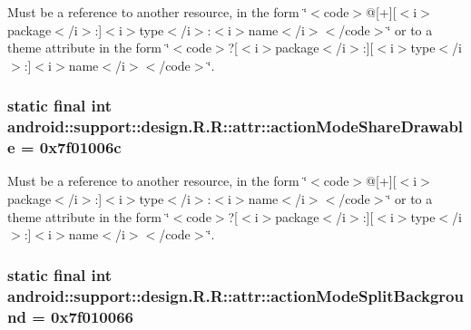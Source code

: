 Must be a reference to another resource, in the form \char`\"{}$<$code$>$@\mbox{[}+\mbox{]}\mbox{[}$<$i$>$package$<$/i$>$:\mbox{]}$<$i$>$type$<$/i$>$:$<$i$>$name$<$/i$>$$<$/code$>$\char`\"{} or to a theme attribute in the form \char`\"{}$<$code$>$?\mbox{[}$<$i$>$package$<$/i$>$:\mbox{]}\mbox{[}$<$i$>$type$<$/i$>$:\mbox{]}$<$i$>$name$<$/i$>$$<$/code$>$\char`\"{}. \hypertarget{classandroid_1_1support_1_1design_1_1_r_1_1attr_8829d2068cacbb3213ba09ca8cf9c358}{
\subsubsection[{actionModeShareDrawable}]{\setlength{\rightskip}{0pt plus 5cm}static final int android::support::design.R.R::attr::actionModeShareDrawable = 0x7f01006c}}
\label{classandroid_1_1support_1_1design_1_1_r_1_1attr_8829d2068cacbb3213ba09ca8cf9c358}


Must be a reference to another resource, in the form \char`\"{}$<$code$>$@\mbox{[}+\mbox{]}\mbox{[}$<$i$>$package$<$/i$>$:\mbox{]}$<$i$>$type$<$/i$>$:$<$i$>$name$<$/i$>$$<$/code$>$\char`\"{} or to a theme attribute in the form \char`\"{}$<$code$>$?\mbox{[}$<$i$>$package$<$/i$>$:\mbox{]}\mbox{[}$<$i$>$type$<$/i$>$:\mbox{]}$<$i$>$name$<$/i$>$$<$/code$>$\char`\"{}. \hypertarget{classandroid_1_1support_1_1design_1_1_r_1_1attr_64c8692755be15de18fc68955dda1d1f}{
\subsubsection[{actionModeSplitBackground}]{\setlength{\rightskip}{0pt plus 5cm}static final int android::support::design.R.R::attr::actionModeSplitBackground = 0x7f010066}}
\label{classandroid_1_1support_1_1design_1_1_r_1_1attr_64c8692755be15de18fc68955dda1d1f}


